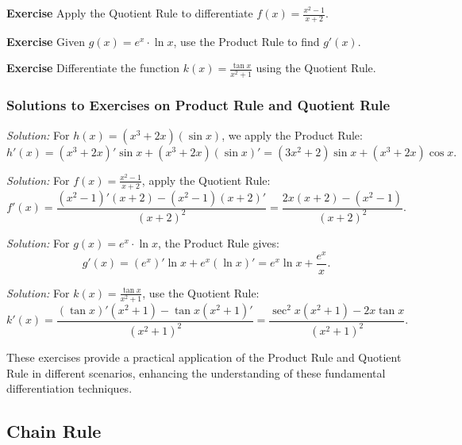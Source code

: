 \documentclass[a4paper,12pt]{book}
\newenvironment{exercise}[1][]
  {\par\medskip\noindent\textbf{Exercise #1} \rmfamily}
  {\medskip}
\newenvironment{solution}[1][]
{\par\noindent\textit{Solution:} \rmfamily}{\medskip}
\begin{document}
\begin{exercise}
Apply the Quotient Rule to differentiate \( f(x) = \frac{x^2 - 1}{x + 2} \).
\end{exercise}

\begin{exercise}
Given \( g(x) = e^x \cdot \ln x \), use the Product Rule to find \( g'(x) \).
\end{exercise}

\begin{exercise}
Differentiate the function \( k(x) = \frac{\tan x}{x^2 + 1} \) using the Quotient Rule.
\end{exercise}

\subsubsection*{Solutions to Exercises on Product Rule and Quotient Rule}

\begin{solution}[to Exercise 1]
For \( h(x) = (x^3 + 2x)(\sin x) \), we apply the Product Rule:
\[ h'(x) = (x^3 + 2x)' \sin x + (x^3 + 2x) (\sin x)' = (3x^2 + 2)\sin x + (x^3 + 2x)\cos x. \]
\end{solution}

\begin{solution}[to Exercise 2]
For \( f(x) = \frac{x^2 - 1}{x + 2} \), apply the Quotient Rule:
\[ f'(x) = \frac{(x^2 - 1)'(x + 2) - (x^2 - 1)(x + 2)'}{(x + 2)^2} = \frac{2x(x + 2) - (x^2 - 1)}{(x + 2)^2}. \]
\end{solution}

\begin{solution}[to Exercise 3]
For \( g(x) = e^x \cdot \ln x \), the Product Rule gives:
\[ g'(x) = (e^x)' \ln x + e^x (\ln x)' = e^x \ln x + \frac{e^x}{x}. \]
\end{solution}

\begin{solution}[to Exercise 4]
For \( k(x) = \frac{\tan x}{x^2 + 1} \), use the Quotient Rule:
\[ k'(x) = \frac{(\tan x)'(x^2 + 1) - \tan x (x^2 + 1)'}{(x^2 + 1)^2} = \frac{\sec^2 x (x^2 + 1) - 2x \tan x}{(x^2 + 1)^2}. \]
\end{solution}

These exercises provide a practical application of the Product Rule and Quotient Rule in different scenarios, enhancing the understanding of these fundamental differentiation techniques.

\subsection{Chain Rule}
\end{document}
